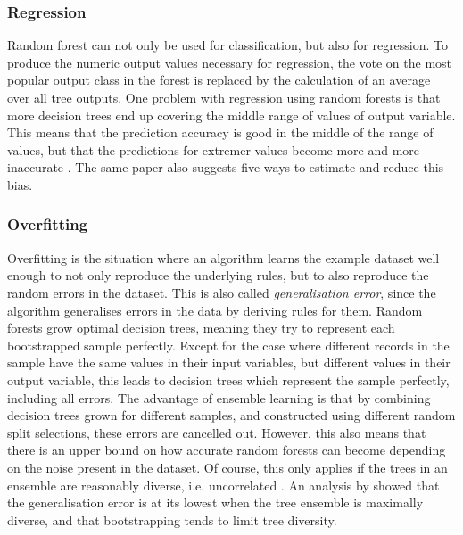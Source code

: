 \documentclass[a4paper,man,12pt,apacite,floatsintext,draftfirst]{apa6} %
\begin{document}
\subsubsection{Regression}
Random forest can not only be used for classification, but also for regression.
To produce the numeric output values necessary for regression,
the vote on the most popular output class in the forest is replaced by the
calculation of an average over all tree outputs.
One problem with regression using random forests is that more decision trees
end up covering the middle range of values of output variable.
This means that the prediction accuracy is good in the middle of the range
of values, but that the predictions for extremer values become more and more
inaccurate \cite{zhang2012bias}.
The same paper also suggests five ways to estimate and reduce this bias.

\subsubsection{Overfitting}
Overfitting \cite{wpOF} is the situation where an algorithm learns the
example dataset well enough to not only reproduce the underlying rules,
but to also reproduce the random errors in the dataset.
This is also called \emph{generalisation error}, since the algorithm
generalises errors in the data by deriving rules for them.
Random forests grow optimal decision trees, meaning they try to represent
each bootstrapped sample perfectly.
Except for the case where different records in the sample have the same
values in their input variables, but different values in their output variable,
this leads to decision trees which represent the sample perfectly,
including all errors.
The advantage of ensemble learning is that by combining decision trees grown
for different samples, and constructed using different random split selections,
these errors are cancelled out.
However, this also means that there is an upper bound on how accurate
random forests can become depending on the noise present in the dataset.
Of course, this only applies if the trees in an ensemble are reasonably
diverse, i.e. uncorrelated \cite{breiman2001random}.
An analysis by \cite{liu2005maximizing} showed that the generalisation error
is at its lowest when the tree ensemble is maximally diverse,
and that bootstrapping tends to limit tree diversity.
\end{document}
